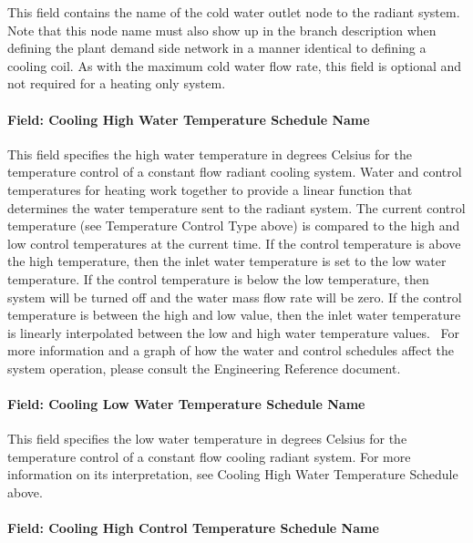 This field contains the name of the cold water outlet node to the radiant system. Note that this node name must also show up in the branch description when defining the plant demand side network in a manner identical to defining a cooling coil. As with the maximum cold water flow rate, this field is optional and not required for a heating only system.

\paragraph{Field: Cooling High Water Temperature Schedule Name}\label{field-cooling-high-water-temperature-schedule-name}

This field specifies the high water temperature in degrees Celsius for the temperature control of a constant flow radiant cooling system. Water and control temperatures for heating work together to provide a linear function that determines the water temperature sent to the radiant system. The current control temperature (see Temperature Control Type above) is compared to the high and low control temperatures at the current time. If the control temperature is above the high temperature, then the inlet water temperature is set to the low water temperature. If the control temperature is below the low temperature, then system will be turned off and the water mass flow rate will be zero. If the control temperature is between the high and low value, then the inlet water temperature is linearly interpolated between the low and high water temperature values.~ For more information and a graph of how the water and control schedules affect the system operation, please consult the Engineering Reference document.

\paragraph{Field: Cooling Low Water Temperature Schedule Name}\label{field-cooling-low-water-temperature-schedule-name}

This field specifies the low water temperature in degrees Celsius for the temperature control of a constant flow cooling radiant system. For more information on its interpretation, see Cooling High Water Temperature Schedule above.

\paragraph{Field: Cooling High Control Temperature Schedule Name}\label{field-cooling-high-control-temperature-schedule-name}

